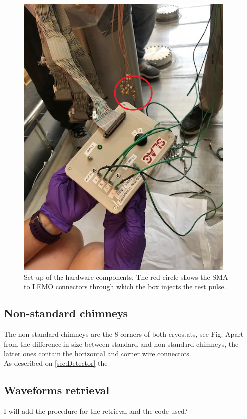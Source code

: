 \begin{enumerate}
\begin{figure}[H]
\centering
\includegraphics[scale=0.6]{fig/setup}
\caption{Set up of the hardware components. The red circle shows the SMA to LEMO connectors through which the box injects the test pulse.}
\end{figure}




\end{enumerate}




\subsection{Non-standard chimneys}
\label{ssec:nonStd_chimn}

The non-standard chimneys are the 8 corners of both cryostats, see Fig. Apart from the difference in size between standard and non-standard chimneys, the latter ones contain the horizontal and corner wire connectors. \\

As described on \cref{sec:Detector} the 


\subsection{Waveforms retrieval}
\label{ssec:DAQ}

I will add the procedure for the retrieval and the code used?

